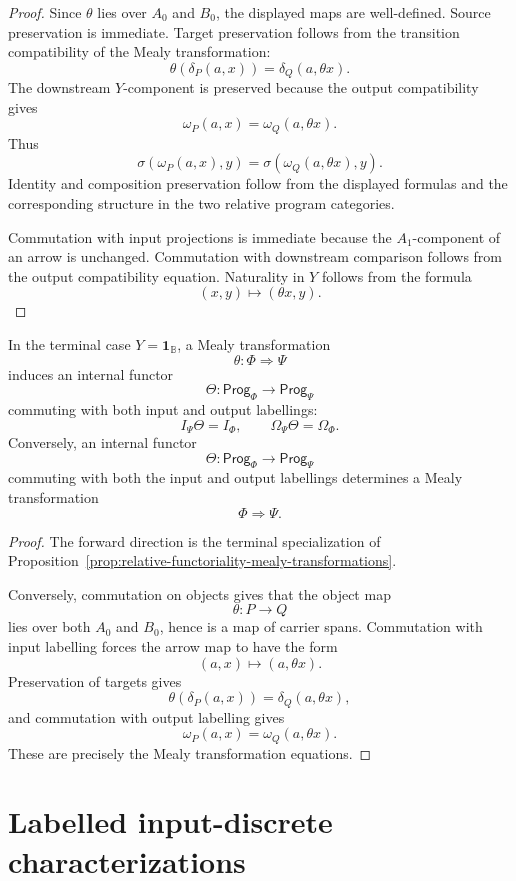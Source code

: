\begin{proof}
Since \(\theta\) lies over \(A_0\) and \(B_0\), the displayed maps are
well-defined. Source preservation is immediate. Target preservation follows
from the transition compatibility of the Mealy transformation:
\[
\theta(\delta_P(a,x))=\delta_Q(a,\theta x).
\]
The downstream \(Y\)-component is preserved because the output compatibility
gives
\[
\omega_P(a,x)=\omega_Q(a,\theta x).
\]
Thus
\[
\sigma(\omega_P(a,x),y)
=
\sigma(\omega_Q(a,\theta x),y).
\]
Identity and composition preservation follow from the displayed formulas and
the corresponding structure in the two relative program categories.

Commutation with input projections is immediate because the \(A_1\)-component
of an arrow is unchanged. Commutation with downstream comparison follows from
the output compatibility equation. Naturality in \(Y\) follows from the formula
\[
(x,y)\mapsto(\theta x,y).
\]
\end{proof}

\begin{corollary}
\label{cor:terminal-transformations-labelled-functors}
In the terminal case \(Y=\mathbf 1_{\mathbb B}\), a Mealy transformation
\[
\theta:\Phi\Rightarrow\Psi
\]
induces an internal functor
\[
\Theta:
\mathsf{Prog}_\Phi\to\mathsf{Prog}_\Psi
\]
commuting with both input and output labellings:
\[
I_\Psi\Theta=I_\Phi,
\qquad
\Omega_\Psi\Theta=\Omega_\Phi.
\]
Conversely, an internal functor
\[
\Theta:
\mathsf{Prog}_\Phi\to\mathsf{Prog}_\Psi
\]
commuting with both the input and output labellings determines a Mealy
transformation
\[
\Phi\Rightarrow\Psi.
\]
\end{corollary}

\begin{proof}
The forward direction is the terminal specialization of
Proposition~\ref{prop:relative-functoriality-mealy-transformations}.

Conversely, commutation on objects gives that the object map
\[
\theta:P\to Q
\]
lies over both \(A_0\) and \(B_0\), hence is a map of carrier spans.
Commutation with input labelling forces the arrow map to have the form
\[
(a,x)\mapsto(a,\theta x).
\]
Preservation of targets gives
\[
\theta(\delta_P(a,x))=\delta_Q(a,\theta x),
\]
and commutation with output labelling gives
\[
\omega_P(a,x)=\omega_Q(a,\theta x).
\]
These are precisely the Mealy transformation equations.
\end{proof}

\section{Labelled input-discrete characterizations}
\label{sec:labelled-input-discrete-characterizations}

